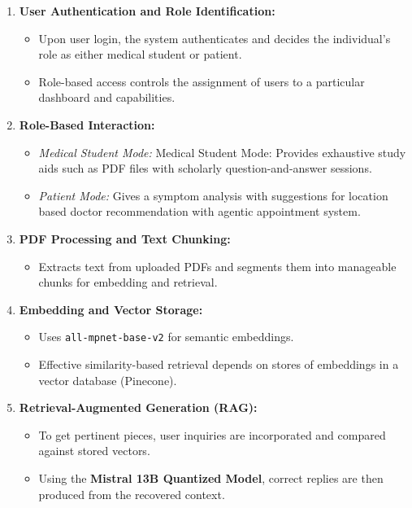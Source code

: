 \vspace{2cm}
\begin{enumerate}[itemsep=2em]
  \item \textbf{User Authentication and Role Identification:} 
    \begin{itemize}
        \item Upon user login, the system authenticates and decides the individual's role as either medical student or patient.
        \item Role-based access controls the assignment of users to a particular dashboard and capabilities.
    \end{itemize}
  \item \textbf{Role-Based Interaction:} 
    \begin{itemize}
        \item \emph{Medical Student Mode:} Medical Student Mode: Provides exhaustive study aids such as PDF files with scholarly question-and-answer sessions.
        \item \emph{Patient Mode:} Gives a symptom analysis with suggestions for location based doctor recommendation with agentic appointment system.
    \end{itemize}
  \item \textbf{PDF Processing and Text Chunking:} 
    \begin{itemize}
        \item Extracts text from uploaded PDFs and segments them into manageable chunks for embedding and retrieval.
    \end{itemize}
  \item \textbf{Embedding and Vector Storage:}
    \begin{itemize}
        \item Uses \texttt{all-mpnet-base-v2} for semantic embeddings.
        \item Effective similarity-based retrieval depends on stores of embeddings in a vector database (Pinecone).
    \end{itemize}
  \item \textbf{Retrieval-Augmented Generation (RAG):} 
    \begin{itemize}
        \item To get pertinent pieces, user inquiries are incorporated and compared against stored vectors.
        \item Using the \textbf{Mistral 13B Quantized Model}, correct replies are then produced from the recovered context.
    \end{itemize}

\end{enumerate}
